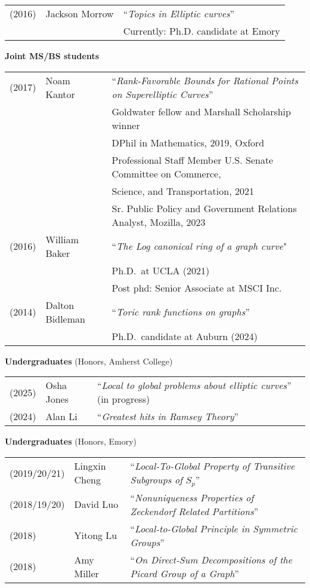 \documentclass[margin,line]{res}
\newcommand{\defi}[1]{\textsf{#1}} 				%
\begin{document}
\begin{resume}
\begin{tabular}{lll}
  (2016) &  Jackson Morrow & ``\emph{Topics in Elliptic curves}'' \\
  & & Currently: Ph.D.  candidate at Emory
\end{tabular}

  
{\bf Joint MS/BS students}
\vspace*{-.15in}

\begin{tabular}{lll}
  (2017) & \defi{Noam Kantor} & ``\emph{Rank-Favorable Bounds for Rational Points on Superelliptic Curves}'' \\
         &&   Goldwater fellow and Marshall Scholarship winner \\
         &&  DPhil in Mathematics, 2019,  Oxford \\
         &&  Professional Staff Member U.S. Senate Committee on Commerce,\\
         &&  \hspace{3pt} Science, and Transportation, 2021   \\
         &&  Sr. Public Policy and Government Relations Analyst, Mozilla, 2023   \\   
  (2016) & \defi{William Baker} & ``\emph{The Log canonical ring of a graph curve}" \\
         &&    Ph.D.~at UCLA (2021)\\
         &&    Post phd: Senior Associate at MSCI Inc.\\
  (2014) & \defi{Dalton Bidleman} & ``\emph{Toric rank functions on graphs}'' \\
  && Ph.D.~candidate at Auburn (2024)\\

\end{tabular}


{\bf Undergraduates} (Honors, Amherst College)
\vspace*{-.15in}

\begin{tabular}{lll}
  (2025) & \defi{Osha Jones} & ``\emph{Local to global problems about elliptic curves}'' (in progress)  \\
  (2024) & \defi{Alan Li} & ``\emph{Greatest hits in Ramsey Theory}''
\end{tabular}

{\bf Undergraduates} (Honors, Emory)
\vspace*{-.15in}

\begin{tabular}{lll}
  (2019/20/21) & \defi{Lingxin Cheng} & ``\emph{Local-To-Global Property of Transitive Subgroups of} $S_p$''\\
  (2018/19/20) & \defi{David Luo} & ``\emph{Nonuniqueness Properties of Zeckendorf Related Partitions}'' \\
  (2018) & \defi{Yitong Lu} & ``\emph{Local-to-Global Principle in Symmetric Groups}'' \\
  (2018) & \defi{Amy Miller} & ``\emph{On Direct-Sum Decompositions of the Picard Group of a Graph}''
\end{tabular}


\end{resume}
\end{document}
